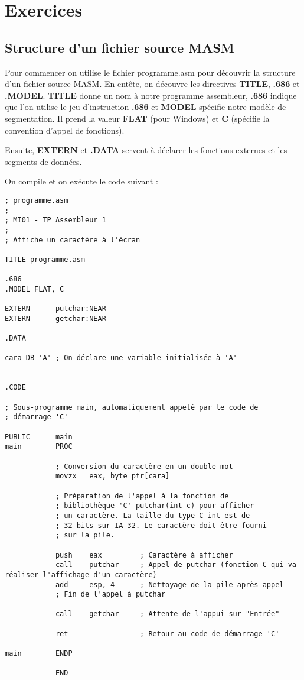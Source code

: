 \chapter{Exercices}
\section{Structure d'un fichier source MASM}
\label{sec1}

Pour commencer on utilise le fichier programme.asm pour découvrir la structure d'un fichier source MASM. En entête, on découvre les directives \textbf{TITLE}, \textbf{.686} et \textbf{.MODEL}. \textbf{TITLE} donne un nom à notre programme assembleur, \textbf{.686} indique que l'on utilise le jeu d'instruction \textbf{.686} et \textbf{MODEL} spécifie notre modèle de segmentation. Il prend la valeur \textbf{FLAT} (pour Windows) et \textbf{C} (spécifie la convention d'appel de fonctions). 

Ensuite, \textbf{EXTERN} et \textbf{.DATA} servent à déclarer les fonctions externes et les segments de données.

On compile et on exécute le code suivant :
\assembly
\begin{lstlisting}
; programme.asm
;
; MI01 - TP Assembleur 1
;
; Affiche un caractère à l'écran

TITLE programme.asm

.686
.MODEL FLAT, C

EXTERN      putchar:NEAR
EXTERN      getchar:NEAR

.DATA

cara DB 'A' ; On déclare une variable initialisée à 'A'


.CODE

; Sous-programme main, automatiquement appelé par le code de
; démarrage 'C'

PUBLIC      main
main        PROC

            ; Conversion du caractère en un double mot
            movzx   eax, byte ptr[cara]

            ; Préparation de l'appel à la fonction de
            ; bibliothèque 'C' putchar(int c) pour afficher
            ; un caractère. La taille du type C int est de
            ; 32 bits sur IA-32. Le caractère doit être fourni
            ; sur la pile.

            push    eax         ; Caractère à afficher
            call    putchar     ; Appel de putchar (fonction C qui va réaliser l'affichage d'un caractère)
            add     esp, 4      ; Nettoyage de la pile après appel
            ; Fin de l'appel à putchar

            call    getchar     ; Attente de l'appui sur "Entrée"

            ret                 ; Retour au code de démarrage 'C'

main        ENDP

            END
\end{lstlisting}


